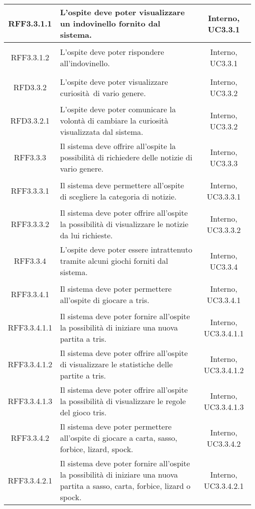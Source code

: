 \begin{longtable}{|c|>{\centering}m{7cm}|c|}
\hypertarget{RFF3.3.1.1}{RFF3.3.1.1} & L'ospite deve poter visualizzare un indovinello fornito dal sistema. & Interno, UC3.3.1\\ \hline
\hypertarget{RFF3.3.1.2}{RFF3.3.1.2} & L'ospite deve poter rispondere all'indovinello. & Interno, UC3.3.1\\ \hline
\hypertarget{RFD3.3.2}{RFD3.3.2} & L'ospite deve poter visualizzare curiosità di vario genere. & Interno, UC3.3.2\\ \hline
\hypertarget{RFD3.3.2.1}{RFD3.3.2.1} & L'ospite deve poter comunicare la volontà di cambiare la curiosità visualizzata dal sistema. & Interno, UC3.3.2\\ \hline
\hypertarget{RFF3.3.3}{RFF3.3.3} & Il sistema deve offrire all'ospite la possibilità di richiedere delle notizie di vario genere. & Interno, UC3.3.3\\ \hline
\hypertarget{RFF3.3.3.1}{RFF3.3.3.1} & Il sistema deve permettere all'ospite di scegliere la categoria di notizie. & Interno, UC3.3.3.1\\ \hline
\hypertarget{RFF3.3.3.2}{RFF3.3.3.2} & Il sistema deve poter offrire all'ospite la possibilità di visualizzare le notizie da lui richieste. & Interno, UC3.3.3.2\\ \hline
\hypertarget{RFF3.3.4}{RFF3.3.4} & L'ospite deve poter essere intrattenuto tramite alcuni giochi forniti dal sistema. & Interno, UC3.3.4\\ \hline
\hypertarget{RFF3.3.4.1}{RFF3.3.4.1} & Il sistema deve poter permettere all'ospite di giocare a tris. & Interno, UC3.3.4.1\\ \hline
\hypertarget{RFF3.3.4.1.1}{RFF3.3.4.1.1} & Il sistema deve poter fornire all'ospite la possibilità di iniziare una nuova partita a tris. & Interno, UC3.3.4.1.1\\ \hline
\hypertarget{RFF3.3.4.1.2}{RFF3.3.4.1.2} & Il sistema deve poter offrire all'ospite di visualizzare le statistiche delle partite a tris. & Interno, UC3.3.4.1.2\\ \hline
\hypertarget{RFF3.3.4.1.3}{RFF3.3.4.1.3} & Il sistema deve poter offrire all'ospite la possibilità di visualizzare le regole del gioco tris. & Interno, UC3.3.4.1.3\\ \hline
\hypertarget{RFF3.3.4.2}{RFF3.3.4.2} & Il sistema deve poter permettere all'ospite di giocare a carta, sasso, forbice, lizard, spock. & Interno, UC3.3.4.2\\ \hline
\hypertarget{RFF3.3.4.2.1}{RFF3.3.4.2.1} & Il sistema deve poter fornire all'ospite la possibilità di iniziare una nuova partita a sasso, carta, forbice, lizard o spock. & Interno, UC3.3.4.2.1\\ \hline

\end{longtable}
